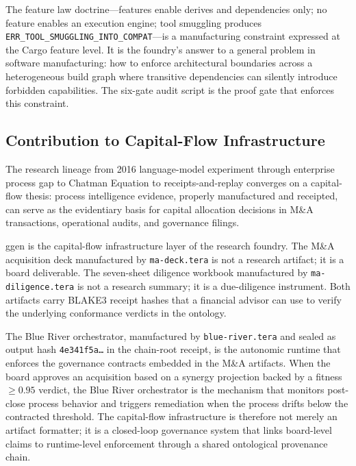 The feature law doctrine---features enable derives and dependencies only; no feature enables an
execution engine; tool smuggling produces \texttt{ERR\_TOOL\_SMUGGLING\_INTO\_COMPAT}---is a
manufacturing constraint expressed at the Cargo feature level. It is the foundry's answer to a
general problem in software manufacturing: how to enforce architectural boundaries across a
heterogeneous build graph where transitive dependencies can silently introduce forbidden
capabilities. The six-gate audit script is the proof gate that enforces this constraint.

\subsection{Contribution to Capital-Flow Infrastructure}
\label{sec:ggen-contribution-capital-flow}

The research lineage from 2016 language-model experiment through enterprise process gap to
Chatman Equation to receipts-and-replay converges on a capital-flow thesis: process intelligence
evidence, properly manufactured and receipted, can serve as the evidentiary basis for capital
allocation decisions in M\&A transactions, operational audits, and governance filings.

ggen is the capital-flow infrastructure layer of the research foundry. The M\&A acquisition deck
manufactured by \texttt{ma-deck.tera} is not a research artifact; it is a board deliverable. The
seven-sheet diligence workbook manufactured by \texttt{ma-diligence.tera} is not a research
summary; it is a due-diligence instrument. Both artifacts carry BLAKE3 receipt hashes that a
financial advisor can use to verify the underlying conformance verdicts in the ontology.

The Blue River orchestrator, manufactured by \texttt{blue-river.tera} and sealed as output hash
\texttt{4e341f5a\ldots} in the chain-root receipt, is the autonomic runtime that enforces the
governance contracts embedded in the M\&A artifacts. When the board approves an acquisition based
on a synergy projection backed by a fitness $\geq 0.95$ verdict, the Blue River orchestrator is
the mechanism that monitors post-close process behavior and triggers remediation when the process
drifts below the contracted threshold. The capital-flow infrastructure is therefore not merely an
artifact formatter; it is a closed-loop governance system that links board-level claims to
runtime-level enforcement through a shared ontological provenance chain.
